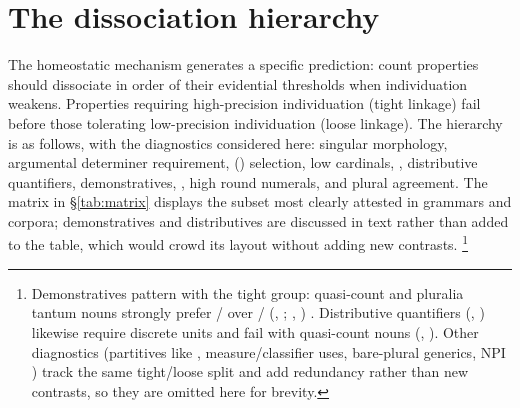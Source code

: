 \documentclass[12pt,a4paper]{article}
\begin{document}
\section{The dissociation hierarchy}\label{sec:hierarchy}

The homeostatic mechanism generates a specific prediction: count properties should dissociate in order of their evidential thresholds when individuation weakens. Properties requiring high-precision individuation (tight linkage) fail before those tolerating low-precision individuation (loose linkage). The hierarchy is as follows, with the diagnostics considered here: singular morphology, argumental determiner requirement, () selection, low cardinals, , distributive quantifiers, demonstratives, , high round numerals, and plural agreement. The matrix in \S\ref{tab:matrix} displays the subset most clearly attested in grammars and corpora; demonstratives and distributives are discussed in text rather than added to the table, which would crowd its layout without adding new contrasts.%
\footnote{Demonstratives pattern with the tight group: quasi-count and pluralia tantum nouns strongly prefer / over / (, ; , ) \citep[p.~356]{huddleston2002}. Distributive quantifiers (, ) likewise require discrete units and fail with quasi-count nouns (, ). Other diagnostics (partitives like , measure/classifier uses, bare-plural generics, NPI ) track the same tight/loose split and add redundancy rather than new contrasts, so they are omitted here for brevity.}
\end{document}
